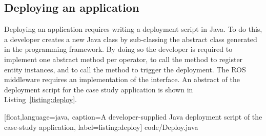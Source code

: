 \subsection{Deploying an application}

Deploying an application requires writing a deployment script in Java.
To do this, a developer creates a new Java class by sub-classing the
abstract class  generated in the programming framework.
By doing so the developer is required to implement one abstract method
per operator, to call the  method to register entity
instances, and to call the  method to trigger the
deployment. The ROS middleware requires an implementation of the
 interface. An abstract of the deployment script for the
case study application is shown in Listing~\ref{listing:deploy}.

%
[float,language=java,%
caption={A developer-supplied Java deployment script of the
 case-study application},%
label={listing:deploy}]%
{code/Deploy.java}
